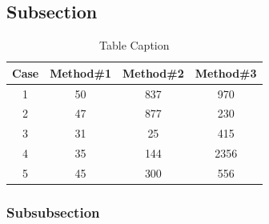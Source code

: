 \cite{gum, ghc-smp}

\subsection{Subsection}

\begin{table}[h]
\begin{center}
\begin{tabular}{c c c c} %
\hline\hline %
Case & Method\#1 & Method\#2 & Method\#3 \\ [0.5ex] %
\hline %
1 & 50 & 837 & 970 \\ %
2 & 47 & 877 & 230 \\
3 & 31 & 25 & 415 \\
4 & 35 & 144 & 2356 \\
5 & 45 & 300 & 556 \\ [1ex] %
\hline %
\end{tabular}\caption{Table Caption}
\label{tab:lable}
\end{center}
\end{table}


\subsubsection{Subsubsection}